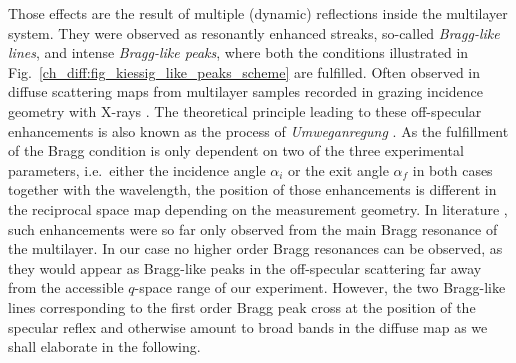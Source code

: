 Those effects are the result of multiple (dynamic) reflections inside the multilayer system. They were observed as resonantly enhanced streaks, so-called \emph{Bragg-like lines}, and intense \emph{Bragg-like peaks}, where both the conditions illustrated in Fig.~\ref{ch_diff:fig_kiessig_like_peaks_scheme} are fulfilled. Often observed in diffuse scattering maps from multilayer samples recorded in grazing incidence geometry with X-rays  \cite{holy_nonspecular_1994}. The theoretical principle leading to these off-specular enhancements is also known as the process of \emph{Umweganregung} \cite{baumbach_influence_1994, baumbach_grazing-incidence_1995}. As the fulfillment of the Bragg condition is only dependent on two of the three experimental parameters, i.e.~either the incidence angle $\alpha_i$ or the exit angle $\alpha_f$ in both cases together with the wavelength, the position of those enhancements is different in the reciprocal space map depending on the measurement geometry. In literature \cite{holy_nonspecular_1994, mikulik_x-ray_1997, baumbach_influence_1994, baumbach_grazing-incidence_1995}, such enhancements were so far only observed from the main Bragg resonance of the multilayer. In our case no higher order Bragg resonances can be observed, as they would appear as Bragg-like peaks in the off-specular scattering far away from the accessible $q$-space range of our experiment. However, the two Bragg-like lines corresponding to the first order Bragg peak cross at the position of the specular reflex and otherwise amount to broad bands in the diffuse map as we shall elaborate in the following.

